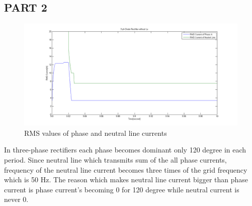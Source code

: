 \documentclass[fleqn, a4paper]{article}
\begin{document}
\subsection{PART 2}
\begin{figure}[H]
  \includegraphics[width=\linewidth]{A3_3.png}
  \caption{RMS values of phase and neutral line currents}
  \label{fig:simulink3}
\end{figure}
In three-phase rectifiers each phase becomes dominant only 120 degree in each period. Since neutral line which transmits sum of the all phase currents, frequency of the neutral line current becomes three times of the grid frequency which is 50 Hz. The reason which makes neutral line current bigger than phase current is phase current's becoming 0 for 120 degree while neutral current is never 0.
\end{document}
